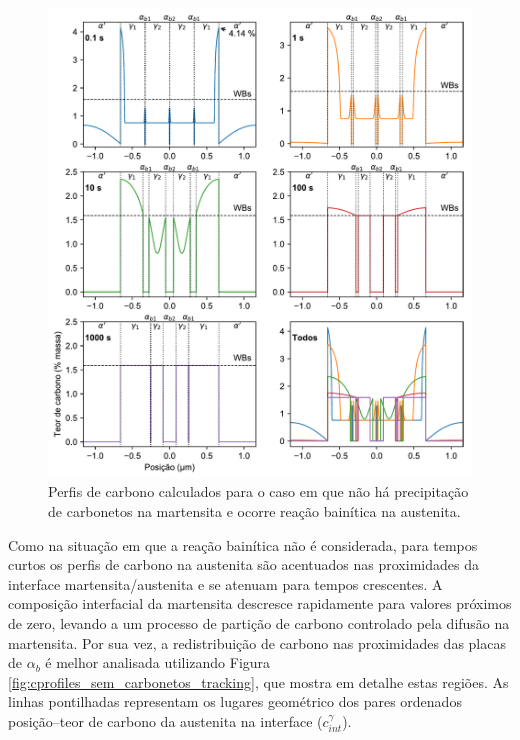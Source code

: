 \begin{figure}
  \includegraphics[width=\textwidth]{img/cpartition/cprofiles/coupled_FoFo_375_CCE_sep.pdf}
  \caption{Perfis de carbono calculados para o caso em que não há precipitação de carbonetos na martensita e ocorre reação bainítica na austenita.}
  \label{fig:cprofiles_sem_carbonetos_sep}
\end{figure}

Como na situação em que a reação bainítica não é considerada, para tempos curtos os perfis de carbono na austenita são acentuados nas proximidades da interface martensita/austenita e se atenuam para tempos crescentes. A composição interfacial da martensita descresce rapidamente para valores próximos de zero, levando a um processo de partição de carbono controlado pela difusão na martensita. Por sua vez, a redistribuição de carbono nas proximidades das placas de $\alpha_b$ é melhor analisada utilizando Figura \ref{fig:cprofiles_sem_carbonetos_tracking}, que mostra em detalhe estas regiões. As linhas pontilhadas representam os lugares geométrico dos pares ordenados posição--teor de carbono da austenita na interface ($c^\gamma_{int}$). 

